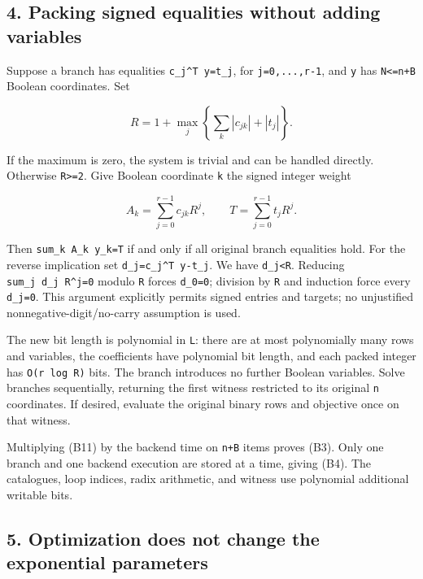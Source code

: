 \hypertarget{af-77b0bb6793-packing-signed-equalities-without-adding-variables}{%
\subsection{4. Packing signed equalities without adding variables}\label{af-77b0bb6793-packing-signed-equalities-without-adding-variables}}

Suppose a branch has equalities \texttt{c\_j\^{}T\ y=t\_j}, for \texttt{j=0,...,r-1}, and \texttt{y} has \texttt{N\textless{}=n+B} Boolean coordinates. Set

\[
R=1+\max_j\left\{\sum_k|c_{jk}|+|t_j|\right\}.
\tag{B12}
\]

If the maximum is zero, the system is trivial and can be handled directly. Otherwise \texttt{R\textgreater{}=2}. Give Boolean coordinate \texttt{k} the signed integer weight

\[
A_k=\sum_{j=0}^{r-1}c_{jk}R^j,
\qquad T=\sum_{j=0}^{r-1}t_jR^j.
\tag{B13}
\]

Then \texttt{sum\_k\ A\_k\ y\_k=T} if and only if all original branch equalities hold. For the reverse implication set \texttt{d\_j=c\_j\^{}T\ y-t\_j}. We have \texttt{\textbar{}d\_j\textbar{}\textless{}R}. Reducing \texttt{sum\_j\ d\_j\ R\^{}j=0} modulo \texttt{R} forces \texttt{d\_0=0}; division by \texttt{R} and induction force every \texttt{d\_j=0}. This argument explicitly permits signed entries and targets; no unjustified nonnegative-digit/no-carry assumption is used.

The new bit length is polynomial in \texttt{L}: there are at most polynomially many rows and variables, the coefficients have polynomial bit length, and each packed integer has \texttt{O(r\ log\ R)} bits. The branch introduces no further Boolean variables. Solve branches sequentially, returning the first witness restricted to its original \texttt{n} coordinates. If desired, evaluate the original binary rows and objective once on that witness.

Multiplying (B11) by the backend time on \texttt{n+B} items proves (B3). Only one branch and one backend execution are stored at a time, giving (B4). The catalogues, loop indices, radix arithmetic, and witness use polynomial additional writable bits.

\hypertarget{af-77b0bb6793-optimization-does-not-change-the-exponential-parameters}{%
\subsection{5. Optimization does not change the exponential parameters}\label{af-77b0bb6793-optimization-does-not-change-the-exponential-parameters}}


